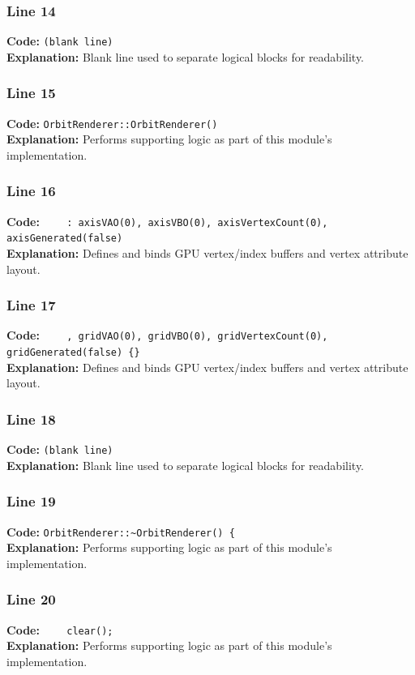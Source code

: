\documentclass[11pt,a4paper]{article}
\begin{document}
\subsubsection*{Line 14}
\textbf{Code:} \texttt{(blank line)}\\
\textbf{Explanation:} Blank line used to separate logical blocks for readability.

\subsubsection*{Line 15}
\textbf{Code:} \verb|OrbitRenderer::OrbitRenderer()|\\
\textbf{Explanation:} Performs supporting logic as part of this module's implementation.

\subsubsection*{Line 16}
\textbf{Code:} \verb|    : axisVAO(0), axisVBO(0), axisVertexCount(0), axisGenerated(false)|\\
\textbf{Explanation:} Defines and binds GPU vertex/index buffers and vertex attribute layout.

\subsubsection*{Line 17}
\textbf{Code:} \verb|    , gridVAO(0), gridVBO(0), gridVertexCount(0), gridGenerated(false) {}|\\
\textbf{Explanation:} Defines and binds GPU vertex/index buffers and vertex attribute layout.

\subsubsection*{Line 18}
\textbf{Code:} \texttt{(blank line)}\\
\textbf{Explanation:} Blank line used to separate logical blocks for readability.

\subsubsection*{Line 19}
\textbf{Code:} \verb|OrbitRenderer::~OrbitRenderer() {|\\
\textbf{Explanation:} Performs supporting logic as part of this module's implementation.

\subsubsection*{Line 20}
\textbf{Code:} \verb|    clear();|\\
\textbf{Explanation:} Performs supporting logic as part of this module's implementation.
\end{document}
